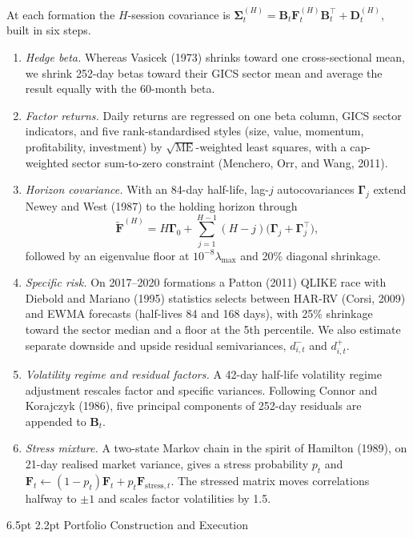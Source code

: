 \documentclass[10pt,twocolumn,letterpaper]{article}
\makeatletter
\renewcommand{\section}{\@startsection{section}{1}{\z@}%
  {6.5pt \@plus 2pt \@minus 1pt}%
  {2.2pt}%
  {\normalfont\normalsize\bfseries}}
\makeatother
\begin{document}
At each formation the $H$-session covariance is $\bm{\Sigma}_t^{(H)} = \mathbf{B}_t \mathbf{F}_t^{(H)}\mathbf{B}_t^\top + \mathbf{D}_t^{(H)}$, built in six steps.
\begin{enumerate}
\item \textit{Hedge beta.} Whereas Vasicek (1973) shrinks toward one cross-sectional mean, we shrink 252-day betas toward their GICS sector mean and average the result equally with the 60-month beta.
\item \textit{Factor returns.} Daily returns are regressed on one beta column, GICS sector indicators, and five rank-standardised styles (size, value, momentum, profitability, investment) by $\sqrt{\mathrm{ME}}$-weighted least squares, with a cap-weighted sector sum-to-zero constraint (Menchero, Orr, and Wang, 2011).
\item \textit{Horizon covariance.} With an 84-day half-life, lag-$j$ autocovariances $\bm{\Gamma}_j$ extend Newey and West (1987) to the holding horizon through
\begin{equation}
\widetilde{\mathbf{F}}^{(H)} = H\bm{\Gamma}_0 + \sum_{j=1}^{H-1}(H - j)\big(\bm{\Gamma}_j + \bm{\Gamma}_j^\top\big),
\end{equation}
followed by an eigenvalue floor at $10^{-8}\lambda_{\max}$ and 20\% diagonal shrinkage.
\item \textit{Specific risk.} On 2017--2020 formations a Patton (2011) QLIKE race with Diebold and Mariano (1995) statistics selects between HAR-RV (Corsi, 2009) and EWMA forecasts (half-lives 84 and 168 days), with 25\% shrinkage toward the sector median and a floor at the 5th percentile. We also estimate separate downside and upside residual semivariances, $d_{i,t}^-$ and $d_{i,t}^+$.
\item \textit{Volatility regime and residual factors.} A 42-day half-life volatility regime adjustment rescales factor and specific variances. Following Connor and Korajczyk (1986), five principal components of 252-day residuals are appended to $\mathbf{B}_t$.
\item \textit{Stress mixture.} A two-state Markov chain in the spirit of Hamilton (1989), on 21-day realised market variance, gives a stress probability $p_t$ and $\mathbf{F}_t \leftarrow (1 - p_t)\mathbf{F}_t + p_t\mathbf{F}_{\text{stress},t}$. The stressed matrix moves correlations halfway to $\pm 1$ and scales factor volatilities by 1.5.
\end{enumerate}

\section{Portfolio Construction and Execution}
\end{document}
